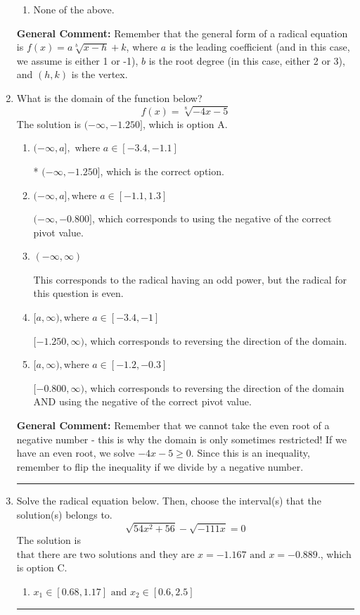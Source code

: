 \documentclass{extbook}[14pt]
\newcommand{\litem}[1]{\item #1

\rule{\textwidth}{0.4pt}}
\begin{document}
\begin{enumerate}
{\begin{enumerate}[label=\Alph*.]
\begin{multicols}{2}
\end{multicols}\item None of the above.\end{enumerate}
\textbf{General Comment:} Remember that the general form of a radical equation is $ f(x) = a \sqrt[b]{x - h} + k $, where $a$ is the leading coefficient (and in this case, we assume is either 1 or -1), $b$ is the root degree (in this case, either 2 or 3), and $(h, k)$ is the vertex.
}
\litem{
What is the domain of the function below?
\[ f(x) = \sqrt[8]{-4 x - 5} \]The solution is \( (-\infty, -1.250] \), which is option A.\begin{enumerate}[label=\Alph*.]
\item \( (-\infty, a], \text{ where } a \in [-3.4, -1.1] \)

* $(-\infty, -1.250]$, which is the correct option.
\item \( (-\infty, a], \text{where } a \in [-1.1, 1.3] \)

$(-\infty, -0.800]$, which corresponds to using the negative of the correct pivot value.
\item \( (-\infty, \infty) \)

This corresponds to the radical having an odd power, but the radical for this question is even.
\item \( [a, \infty), \text{where } a \in [-3.4, -1] \)

 $[-1.250, \infty)$, which corresponds to reversing the direction of the domain.
\item \( [a, \infty), \text{where } a \in [-1.2, -0.3] \)

$[-0.800, \infty)$, which corresponds to reversing the direction of the domain AND using the negative of the correct pivot value.
\end{enumerate}

\textbf{General Comment:} Remember that we cannot take the even root of a negative number - this is why the domain is only sometimes restricted! If we have an even root, we solve $-4 x - 5 \geq 0$. Since this is an inequality, remember to flip the inequality if we divide by a negative number.
}
\litem{
Solve the radical equation below. Then, choose the interval(s) that the solution(s) belongs to.
\[ \sqrt{54 x^2 + 56} - \sqrt{-111 x} = 0 \]The solution is \( \text{that there are two solutions and they are } x = -1.167 \text{ and } x = -0.889. \), which is option C.\begin{enumerate}[label=\Alph*.]
\item \( x_1 \in [0.68, 1.17] \text{ and } x_2 \in [0.6,2.5] \)


\end{enumerate}}
\end{enumerate}
\end{document}
